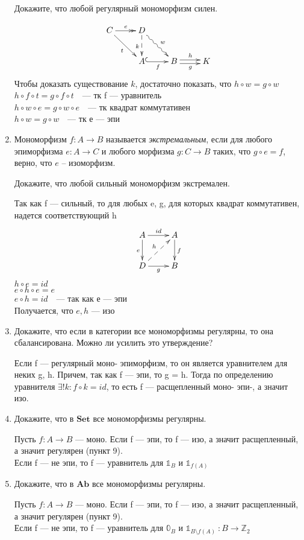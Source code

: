 \documentclass[draft]{article}
\newcommand{\cat}[1]{\mathbf{#1}}
\newcommand{\Set}{\cat{Set}}
\newcommand{\Ab}{\cat{Ab}}
\begin{document}
\begin{enumerate}
Докажите, что любой регулярный мономорфизм силен.

\[ \xymatrix{ 
C \ar@{->>}[r]^e \ar[dr]_t & D \ar@{~>}[dr]^w \ar@{-->}[d]_k &   & \\
  & A \ar@{^{(}->}[r]_f & B \ar@<-0.5ex>[r]_g \ar@<0.5ex>[r]^h & K
 } \]
Чтобы доказать существование $k$, достаточно показать, что $h\circ w = g \circ w$\\
$h\circ f \circ t = g \circ f \circ t~~~$ --- тк f --- уравнитель\\
$h\circ w \circ e = g \circ w \circ e~~~$ --- тк квадрат коммутативен\\
$h\circ w = g \circ w~~~$ --- тк е --- эпи

\item Мономорфизм $f : A \to B$ называется \emph{экстремальным}, если для любого эпиморфизма $e : A \to C$ и любого морфизма $g : C \to B$ таких, что $g \circ e = f$, верно, что $e$ -- изоморфизм.

Докажите, что любой сильный мономорфизм экстремален.

Так как f --- сильный, то для любых e, g, для которых квадрат коммутативен, надется соответствующий h
\[ \xymatrix{ A \ar[r]^{id} \ar[d]_e      & A \ar[d]^f \\
              D \ar[r]_g \ar@{-->}[ur]^h & B
            } \]
$h \circ e = id$\\
$e \circ h \circ e = e$\\
$e \circ h = id~~~$ --- так как е --- эпи\\
Получается, что $e, h$ --- изо

\item Докажите, что если в категории все мономорфизмы регулярны, то она сбалансирована. Можно ли усилить это утверждение?

Если f --- регулярный моно- эпиморфизм, то он является уравнителем для неких g, h. Причем, так как f --- эпи, то g = h. Тогда по определению уравнителя $\exists!k: f \circ k = id$, то есть f --- расщепленный моно- эпи-, а значит изо.

\item Докажите, что в $\Set$ все мономорфизмы регулярны.

Пусть $f : A \to B$ --- моно. Если f --- эпи, то f --- изо, а значит расщепленный, а значит регулярен (пункт 9). \\
Если f --- не эпи, то f --- уравнитель для $\mathbb{1}_B$ и $\mathbb{1}_{f(A)}$

\item Докажите, что в $\Ab$ все мономорфизмы регулярны.

Пусть $f : A \to B$ --- моно. Если f --- эпи, то f --- изо, а значит расщепленный, а значит регулярен (пункт 9). \\
Если f --- не эпи, то f --- уравнитель для $\mathbb{0}_B$ и $\mathbb{1}_{B\setminus f(A)} ~: B \to \mathbb{Z}_2$

\end{enumerate}
\end{document}
